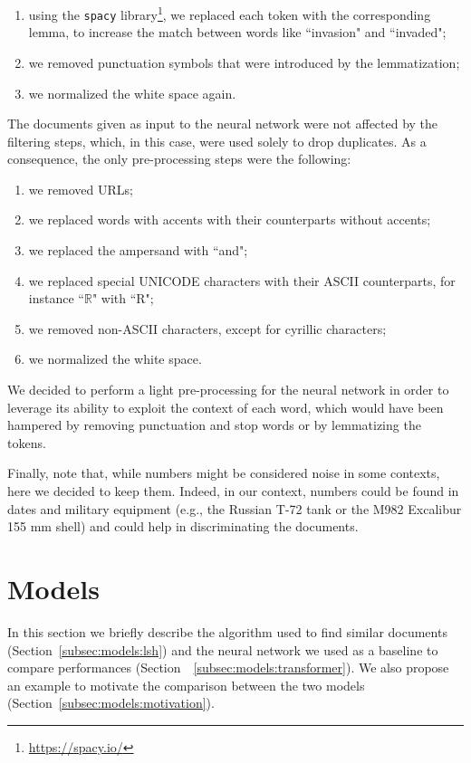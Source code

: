 \documentclass[runningheads]{llncs}
\begin{document}
\begin{enumerate}
  \item using the \texttt{spacy} library\footnote{\url{https://spacy.io/}}, we replaced each token with the corresponding lemma, to increase the match between words like “invasion" and “invaded";
  \item we removed punctuation symbols that were introduced by the lemmatization;
  \item we normalized the white space again.
\end{enumerate}

The documents given as input to the neural network were not affected by the filtering steps, which, in this case, were used solely to drop duplicates. As a consequence, the only pre-processing steps were the following:

\begin{enumerate}
  \item we removed URLs;
  \item we replaced words with accents with their counterparts without accents;
  \item we replaced the ampersand with “and";
  \item we replaced special UNICODE characters with their ASCII counterparts, for instance “$\mathbb{R}$" with “R";
  \item we removed non-ASCII characters, except for cyrillic characters;
  \item we normalized the white space.
\end{enumerate}

We decided to perform a light pre-processing for the neural network in order to leverage its ability to exploit the context of each word, which would have been hampered by removing punctuation and stop words or by lemmatizing the tokens.

Finally, note that, while numbers might be considered noise in some contexts, here we decided to keep them. Indeed, in our context, numbers could be found in dates and military equipment (e.g., the Russian T-72 tank or the M982 Excalibur 155 mm shell) and could help in discriminating the documents.

\section{Models}
\label{sec:models}

In this section we briefly describe the algorithm used to find similar documents (Section~\ref{subsec:models:lsh}) and the neural network we used as a baseline to compare performances (Section~~\ref{subsec:models:transformer}). We also propose an example to motivate the comparison between the two models (Section~\ref{subsec:models:motivation}).
\end{document}
